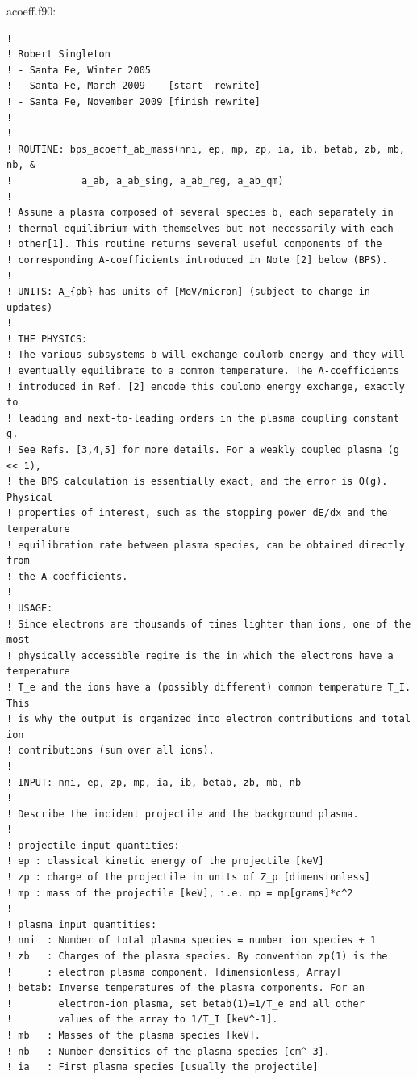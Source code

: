 \documentclass[preprint,12pt,eqsecnum,nofootinbib,amsmath,amssymb]{revtex4}
\begin{document}
\vskip1cm 
\noindent
acoeff.f90:
{
\baselineskip 10pt
\begin{verbatim}
!
! Robert Singleton
! - Santa Fe, Winter 2005 
! - Santa Fe, March 2009    [start  rewrite]
! - Santa Fe, November 2009 [finish rewrite]
!
! 
! ROUTINE: bps_acoeff_ab_mass(nni, ep, mp, zp, ia, ib, betab, zb, mb, nb, &
!            a_ab, a_ab_sing, a_ab_reg, a_ab_qm)
! 
! Assume a plasma composed of several species b, each separately in 
! thermal equilibrium with themselves but not necessarily with each 
! other[1]. This routine returns several useful components of the 
! corresponding A-coefficients introduced in Note [2] below (BPS).
! 
! UNITS: A_{pb} has units of [MeV/micron] (subject to change in updates)
! 
! THE PHYSICS:
! The various subsystems b will exchange coulomb energy and they will
! eventually equilibrate to a common temperature. The A-coefficients 
! introduced in Ref. [2] encode this coulomb energy exchange, exactly to 
! leading and next-to-leading orders in the plasma coupling constant g.
! See Refs. [3,4,5] for more details. For a weakly coupled plasma (g << 1), 
! the BPS calculation is essentially exact, and the error is O(g). Physical 
! properties of interest, such as the stopping power dE/dx and the temperature 
! equilibration rate between plasma species, can be obtained directly from 
! the A-coefficients. 
!
! USAGE:
! Since electrons are thousands of times lighter than ions, one of the most
! physically accessible regime is the in which the electrons have a temperature 
! T_e and the ions have a (possibly different) common temperature T_I. This 
! is why the output is organized into electron contributions and total ion 
! contributions (sum over all ions).
!
! INPUT: nni, ep, zp, mp, ia, ib, betab, zb, mb, nb
!
! Describe the incident projectile and the background plasma. 
!
! projectile input quantities:
! ep : classical kinetic energy of the projectile [keV]
! zp : charge of the projectile in units of Z_p [dimensionless]
! mp : mass of the projectile [keV], i.e. mp = mp[grams]*c^2
!
! plasma input quantities:
! nni  : Number of total plasma species = number ion species + 1
! zb   : Charges of the plasma species. By convention zp(1) is the 
!      : electron plasma component. [dimensionless, Array]
! betab: Inverse temperatures of the plasma components. For an
!        electron-ion plasma, set betab(1)=1/T_e and all other
!        values of the array to 1/T_I [keV^-1].
! mb   : Masses of the plasma species [keV]. 
! nb   : Number densities of the plasma species [cm^-3]. 
! ia   : First plasma species [usually the projectile]

\end{verbatim}}
\end{document}
